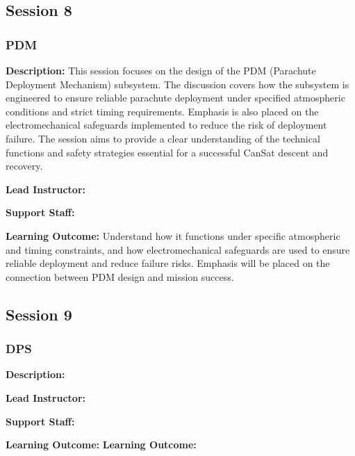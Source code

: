 \documentclass[a4paper,12pt]{article}
\begin{document}
\subsection{Session 8}
\subsubsection{PDM}

\textbf{Description:} This session focuses on the design of the PDM (Parachute Deployment Mechanism) subsystem. The discussion covers how the subsystem is engineered to ensure reliable parachute deployment under specified atmospheric conditions and strict timing requirements. Emphasis is also placed on the electromechanical safeguards implemented to reduce the risk of deployment failure. The session aims to provide a clear understanding of the technical functions and safety strategies essential for a successful CanSat descent and recovery.

\textbf{Lead Instructor:}

\textbf{Support Staff: }


\textbf{Learning Outcome:} Understand how it functions under specific atmospheric and timing constraints, and how electromechanical safeguards are used to ensure reliable deployment and reduce failure risks. Emphasis will be placed on the connection between PDM design and mission success.


\subsection{Session 9}
\subsubsection{DPS}

\textbf{Description:} 

\textbf{Lead Instructor:}

\textbf{Support Staff: }

\textbf{Learning Outcome:} 
\textbf{Learning Outcome:} 
\end{document}
